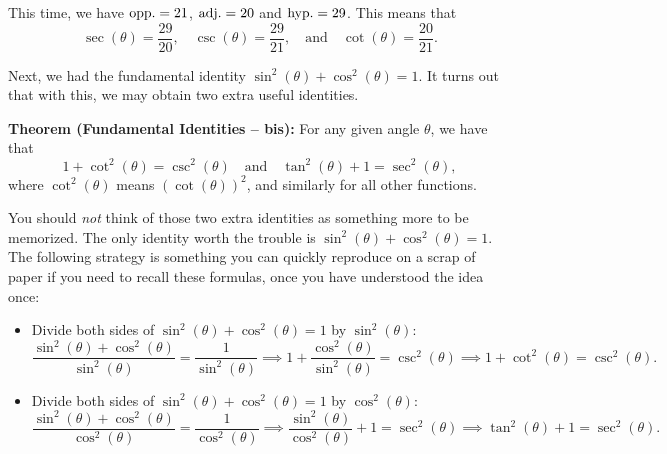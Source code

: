 \documentclass{ximera}
\begin{document}
\begin{example}
\begin{enumerate}[label=\alph*.]
\begin{figure}[h]
    \end{figure}
    \begin{explanation}
      This time, we have ${\rm opp.} = 21$, ${\rm adj.} = 20$ and ${\rm hyp.} = 29$. This means that $$\sec(\theta) = \frac{29}{20}, \quad \csc(\theta) =\frac{29}{21}, \quad\mbox{and}\quad \cot(\theta) =\frac{20}{21}. $$
    \end{explanation}
  \end{enumerate}
\end{example}

Next, we had the fundamental identity $\sin^2(\theta) + \cos^2(\theta) = 1$. It turns out that with this, we may obtain two extra useful identities.

\begin{callout}
  {\bf Theorem (Fundamental Identities -- bis):} For any given angle $\theta$, we have that $$1 + \cot^2(\theta) = \csc^2(\theta)\quad\mbox{and}\quad \tan^2(\theta) + 1 = \sec^2(\theta),$$where $\cot^2(\theta)$ means $(\cot(\theta))^2$, and similarly for all other functions.
\end{callout}

You should \emph{not} think of those two extra identities as something more to be memorized. The only identity worth the trouble is $\sin^2(\theta) + \cos^2(\theta) = 1$. The following strategy is something you can quickly reproduce on a scrap of paper if you need to recall these formulas, once you have understood the idea once:

\begin{itemize}
\item Divide both sides of $\sin^2(\theta)+\cos^2(\theta) = 1$ by $\sin^2(\theta)$: $$\frac{\sin^2(\theta)+\cos^2(\theta)}{\sin^2(\theta)} = \frac{1}{\sin^2(\theta)} \implies1 + \frac{\cos^2(\theta)}{\sin^2(\theta)} = \csc^2(\theta) \implies 1+\cot^2(\theta) = \csc^2(\theta).$$
\item Divide both sides of $\sin^2(\theta)+\cos^2(\theta) = 1$ by $\cos^2(\theta)$:  $$\frac{\sin^2(\theta)+\cos^2(\theta)}{\cos^2(\theta)} = \frac{1}{\cos^2(\theta)} \implies \frac{\sin^2(\theta)}{\cos^2(\theta)} + 1 = \sec^2(\theta) \implies \tan^2(\theta)+1=\sec^2(\theta).$$
\end{itemize}
\end{document}

